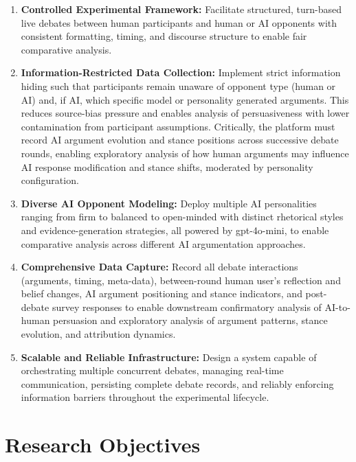 \begin{enumerate}
    \item \textbf{Controlled Experimental Framework:} Facilitate structured, turn-based live debates
    between human participants and human or AI opponents with consistent
    formatting, timing, and discourse structure to enable fair comparative analysis.

    \item \textbf{Information-Restricted Data Collection:} Implement strict information hiding
    such that participants remain unaware of opponent type (human or AI) and, if AI, which
    specific model or personality generated arguments. This reduces source-bias pressure and enables
    analysis of persuasiveness with lower contamination from participant assumptions. Critically, the platform
    must record AI argument evolution and stance positions across successive debate rounds,
    enabling exploratory analysis of how human arguments may influence AI response modification and
    stance shifts, moderated by personality configuration.

    \item \textbf{Diverse AI Opponent Modeling:} Deploy multiple AI personalities ranging from firm
    to balanced to open-minded with distinct rhetorical styles and evidence-generation strategies,
    all powered by gpt-4o-mini, to enable comparative analysis across different AI argumentation approaches.

    \item \textbf{Comprehensive Data Capture:} Record all debate interactions (arguments, timing,
    meta-data), between-round human user's reflection and belief changes, AI argument positioning and stance
    indicators, and post-debate survey responses to enable downstream confirmatory analysis of AI-to-human
    persuasion and exploratory analysis of argument patterns, stance evolution, and attribution dynamics.

    \item \textbf{Scalable and Reliable Infrastructure:} Design a system capable of orchestrating
    multiple concurrent debates, managing real-time communication, persisting complete debate
    records, and reliably enforcing information barriers throughout the experimental lifecycle.
\end{enumerate}

\section{Research Objectives}

